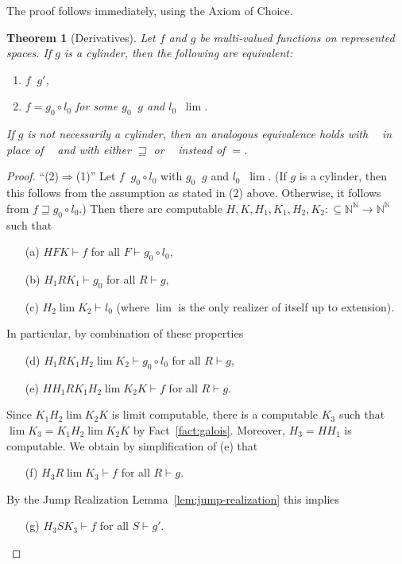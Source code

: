 \documentclass[a4paper]{amsart}
\def\IN{{\mathbb{N}}}
\def\TO{\Longrightarrow}
\def\In{\subseteq}
\def\Baire{{\IN^\IN}}
\def\leqW{\mathop{\leq_{\mathrm{W}}}}
\def\leqSW{\mathop{\leq_{\mathrm{sW}}}}
\newtheorem{theorem}{Theorem}[section]
\theoremstyle{definition}
\begin{document}
The proof follows immediately, using the Axiom of Choice.

\begin{theorem}[Derivatives]
\label{thm:derivatives}
Let $f$ and $g$ be multi-valued functions on represented spaces.
If $g$ is a cylinder, then the following are equivalent:
\begin{enumerate}
\item $f\leqW g'$,
\item $f=g_0\circ l_0$ for some $g_0\leqW g$ and $l_0\leqW\lim$.
\end{enumerate}
If $g$ is not necessarily a cylinder, then an analogous equivalence holds with $\leqSW$ in place of $\leqW$
and with either $\sqsupseteq$ or $\leqSW$ instead of $=$.
\end{theorem}
\begin{proof}
``(2)$\TO$(1)'' 
Let  $f\leqSW g_0\circ l_0$ with $g_0\leqSW g$ and $l_0\leqSW \lim$.
(If $g$ is a cylinder, then this follows from the assumption as stated in (2) above.
Otherwise, it follows from $f\sqsupseteq g_0\circ l_0$.)
Then there are computable $H,K,H_1,K_1,H_2,K_2:\In\Baire\to\Baire$ such that
\begin{enumerate}
\item[(a)] $HFK\vdash f$ for all $F\vdash g_0\circ l_0$,
\item[(b)] $H_1RK_1\vdash g_0$ for all $R\vdash g$,
\item[(c)] $H_2\lim K_2\vdash l_0$ (where $\lim$ is the only realizer of itself up to extension).
\end{enumerate}
In particular, by combination of these properties
\begin{enumerate}
\item[(d)] $H_1RK_1H_2\lim K_2\vdash g_0\circ l_0$ for all $R\vdash g$,
\item[(e)] $HH_1RK_1H_2\lim K_2K\vdash f$ for all $R\vdash g$.
\end{enumerate}
Since $K_1H_2\lim K_2K$ is limit computable, there is a computable $K_3$ such that
$\lim K_3=K_1H_2\lim K_2K$ by Fact~\ref{fact:galois}. Moreover, $H_3=HH_1$ is computable.
We obtain by simplification of (e) that
\begin{enumerate}
\item[(f)] $H_3R\lim K_3\vdash f$ for all $R\vdash g$.
\end{enumerate}
By the Jump Realization Lemma~\ref{lem:jump-realization} this implies
\begin{enumerate}
\item[(g)] $H_3SK_3\vdash f$ for all $S\vdash g'$.

\end{enumerate}
\end{proof}
\end{document}
